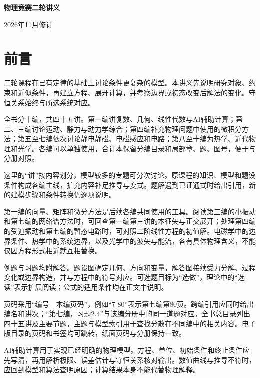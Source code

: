 \documentclass[UTF8,11pt,twoside,openany]{ctexbook}
\begin{document}
\frontmatter
\begin{titlepage}\centering\vspace*{35mm}
{\Huge\bfseries 物理竞赛二轮讲义\par}
\vspace{14mm}{\Large 十编合订本\par}
\vspace{20mm}{\large 数学方法与微积分\par 力学与电磁学\par 热学、近代物理与光学\par}
\vfill{\large 2026年11月修订\par}
\end{titlepage}
\chapter*{前言}
二轮课程在已有定律的基础上讨论条件更复杂的模型。本讲义先说明研究对象、约束和近似条件，再建立方程、展开计算，并考察边界或初态改变后解法的变化。守恒关系始终与所选系统对应。

全书分十编，共四十五讲。第一编讲复数、几何、线性代数与AI辅助计算；第二、三编讨论运动、静力与动力学综合；第四编补充物理问题中使用的微积分方法；第五至七编依次讨论静电静磁、电磁感应和电路；第八至十编为热学、近代物理和光学。各编可以单独使用，合订本保留分编目录和局部章、题、图号，便于与分册对照。

这里的“讲”按内容划分，模型较多的专题可分次讨论。原课程的知识、模型和题设条件构成各编主线，扩充内容补足推导与变式。题解遇到已证通式时给出引用，新的建模步骤和条件转换仍逐项说明。

第一编的向量、矩阵和微分方法是后续各编共同使用的工具。阅读第三编的小振动和第七编的网络谱方法时，可回查第一编第三讲的本征矢与正交展开；处理第四编的受迫振动和第七编的暂态电路时，可对照二阶线性方程的初值解。电磁学中的边界条件、热学中的系统边界，以及光学中的波矢与能流，各有具体物理含义，不能仅因方程形式相近就互相替换。

例题与习题均附解答。题设图确定几何、方向和变量，解答图接续受力分解、过程变化或边界构造，并与方程中的符号对应。可选题目标为“选做”，理论中的“选读”表示扩展阅读；公式的适用条件均在正文中说明。

页码采用“编号—本编页码”，例如“7-80”表示第七编第80页。跨编引用应同时给出编名和讲次；“第七编，习题2.4”与该编分册中的同一道题对应。全书总目录列出四十五讲及主要节题，主题与模型索引用于查找分散在不同编中的相关内容。电子版目录的页码和书签均可跳转，纸面页码与分册保持一致。

AI辅助计算用于实现已经明确的物理模型。方程、单位、初始条件和终止条件应先写清，再用解析极限、误差估计与守恒关系核对输出。数值曲线与推导不符时，应回到模型和算法查明原因；计算结果本身不能代替物理解释。
\end{document}
